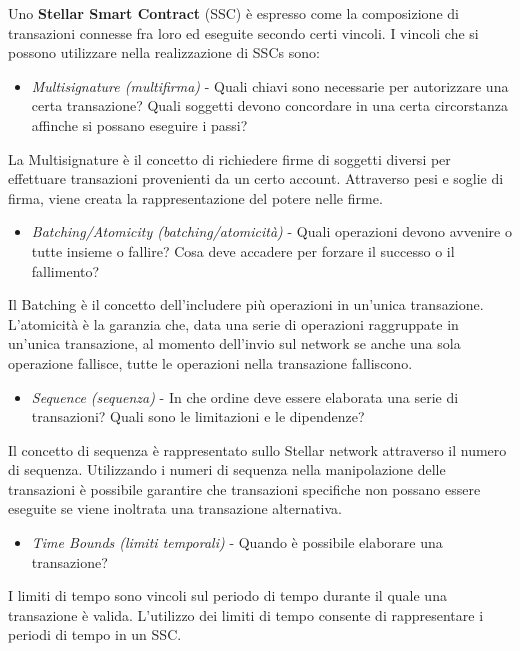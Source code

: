 Uno \textbf{Stellar Smart Contract} (SSC) è espresso come la composizione
di transazioni connesse fra loro ed eseguite secondo certi vincoli.
I vincoli che si possono utilizzare nella realizzazione di SSCs sono:

\begin{itemize}
	\item \textit{Multisignature (multifirma)} - Quali chiavi sono necessarie
	      per autorizzare
	      una certa transazione? Quali soggetti devono concordare in una certa
	      circorstanza affinche si possano eseguire i passi?
\end{itemize}
La Multisignature è il concetto di richiedere firme di soggetti diversi per
effettuare transazioni provenienti da un certo account.
Attraverso pesi e soglie di firma,
viene creata la rappresentazione del potere nelle firme.

\begin{itemize}
	\item \textit{Batching/Atomicity (batching/atomicità)} -
	      Quali operazioni devono avvenire
	      o tutte insieme o fallire?
	      Cosa deve accadere per forzare il successo o il fallimento?
\end{itemize}
Il Batching è il concetto dell'includere più operazioni in un'unica transazione.
L'atomicità è la garanzia che, data una serie di operazioni raggruppate in
un'unica transazione,
al momento dell'invio sul network se anche una sola operazione fallisce,
tutte le operazioni nella transazione falliscono.

\begin{itemize}
	\item \textit{Sequence (sequenza)} -
	      In che ordine deve essere elaborata una serie di transazioni?
	      Quali sono le limitazioni e le dipendenze?
\end{itemize}
Il concetto di sequenza è rappresentato sullo Stellar network attraverso
il numero di sequenza. Utilizzando i numeri di sequenza
nella manipolazione delle transazioni è possibile garantire che
transazioni specifiche non possano essere eseguite
se viene inoltrata una transazione alternativa.

\begin{itemize}
	\item \textit{Time Bounds (limiti temporali)} -
	      Quando è possibile elaborare una transazione?
\end{itemize}
I limiti di tempo sono vincoli sul periodo di tempo durante il quale
una transazione è valida. L'utilizzo dei limiti di tempo
consente di rappresentare i periodi di tempo in un SSC.
